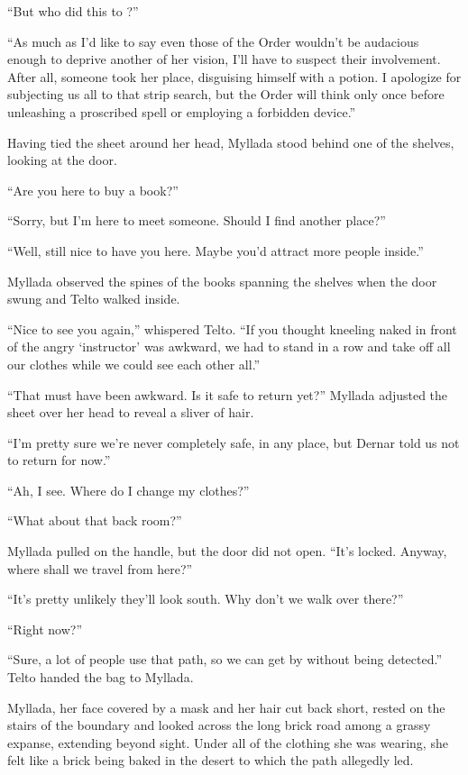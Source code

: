 ``But who did this to \yronsyncra?''

``As much as I'd like to say even those of the Order wouldn't be audacious enough to deprive another of her vision, I'll have to suspect their involvement. After all, someone took her place, disguising himself with a potion. I apologize for subjecting us all to that strip search, but the Order will think only once before unleashing a proscribed spell or employing a forbidden device.''

\centeredstars

Having tied the sheet around her head, Myllada stood behind one of the shelves, looking at the door.

``Are you here to buy a book?''

``Sorry, but I'm here to meet someone. Should I find another place?''

``Well, still nice to have you here. Maybe you'd attract more people inside.''

Myllada observed the spines of the books spanning the shelves when the door swung and Telto walked inside.

``Nice to see you again,'' whispered Telto. ``If you thought kneeling naked in front of the angry `instructor' was awkward, we had to stand in a row and take off all our clothes while we could see each other all.''

``That must have been awkward. Is it safe to return yet?'' Myllada adjusted the sheet over her head to reveal a sliver of hair.

``I'm pretty sure we're never completely safe, in any place, but Dernar told us not to return for now.''

``Ah, I see. Where do I change my clothes?''

``What about that back room?''

Myllada pulled on the handle, but the door did not open. ``It's locked. Anyway, where shall we travel from here?''

``It's pretty unlikely they'll look south. Why don't we walk over there?''

``Right now?''

``Sure, a lot of people use that path, so we can get by without being detected.'' Telto handed the bag to Myllada.

\centeredstars

Myllada, her face covered by a mask and her hair cut back short, rested on the stairs of the boundary and looked across the long brick road among a grassy expanse, extending beyond sight. Under all of the clothing she was wearing, she felt like a brick being baked in the desert to which the path allegedly led.

